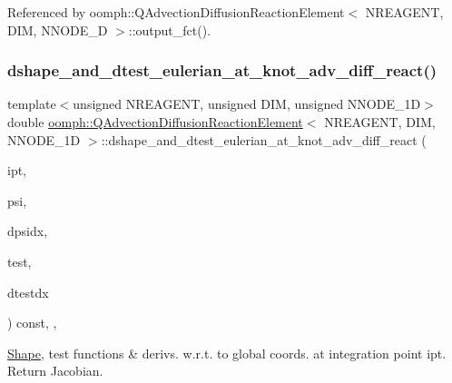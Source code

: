 Referenced by oomph\+::\+Q\+Advection\+Diffusion\+Reaction\+Element$<$ N\+R\+E\+A\+G\+E\+N\+T, D\+I\+M, N\+N\+O\+D\+E\+\_\+D $>$\+::output\+\_\+fct().

\mbox{\label{classoomph_1_1QAdvectionDiffusionReactionElement_a2a52a7accae36bd8e3bb46e659f9c983}} 
\subsubsection{\texorpdfstring{dshape\+\_\+and\+\_\+dtest\+\_\+eulerian\+\_\+at\+\_\+knot\+\_\+adv\+\_\+diff\+\_\+react()}{dshape\_and\_dtest\_eulerian\_at\_knot\_adv\_diff\_react()}}
{\footnotesize\ttfamily template$<$unsigned N\+R\+E\+A\+G\+E\+NT, unsigned D\+IM, unsigned N\+N\+O\+D\+E\+\_\+1D$>$ \\
double \hyperlink{classoomph_1_1QAdvectionDiffusionReactionElement}{oomph\+::\+Q\+Advection\+Diffusion\+Reaction\+Element}$<$ N\+R\+E\+A\+G\+E\+NT, D\+IM, N\+N\+O\+D\+E\+\_\+1D $>$\+::dshape\+\_\+and\+\_\+dtest\+\_\+eulerian\+\_\+at\+\_\+knot\+\_\+adv\+\_\+diff\+\_\+react (\begin{DoxyParamCaption}\item[{const unsigned \&}]{ipt,  }\item[{\hyperlink{classoomph_1_1Shape}{Shape} \&}]{psi,  }\item[{\hyperlink{classoomph_1_1DShape}{D\+Shape} \&}]{dpsidx,  }\item[{\hyperlink{classoomph_1_1Shape}{Shape} \&}]{test,  }\item[{\hyperlink{classoomph_1_1DShape}{D\+Shape} \&}]{dtestdx }\end{DoxyParamCaption}) const\hspace{0.3cm}{\ttfamily [inline]}, {\ttfamily [protected]}, {\ttfamily [virtual]}}



\hyperlink{classoomph_1_1Shape}{Shape}, test functions \& derivs. w.\+r.\+t. to global coords. at integration point ipt. Return Jacobian. 

